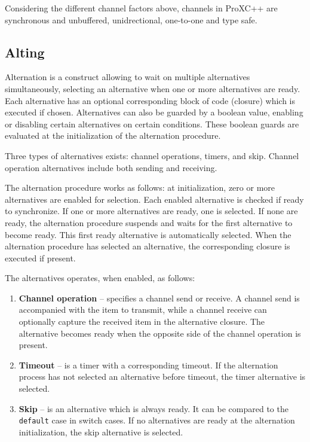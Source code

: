 Considering the different channel factors above, channels in ProXC++ are synchronous and unbuffered, unidrectional, one\hyp{}to\hyp{}one and type safe.


\subsection{Alting}
\label{subsec:alting_design}


Alternation is a construct allowing to wait on multiple alternatives simultaneously, selecting an alternative when one or more alternatives are ready. Each alternative has an optional corresponding block of code (closure) which is executed if chosen. Alternatives can also be guarded by a boolean value, enabling or disabling certain alternatives on certain conditions. These boolean guards are evaluated at the initialization of the alternation procedure.

Three types of alternatives exists: channel operations, timers, and skip. Channel operation alternatives include both sending and receiving.

The alternation procedure works as follows: at initialization, zero or more alternatives are enabled for selection. Each enabled alternative is checked if ready to synchronize. If one or more alternatives are ready, one is selected. If none are ready, the alternation procedure suspends and waits for the first alternative to become ready. This first ready alternative is automatically selected. When the alternation procedure has selected an alternative, the corresponding closure is executed if present.

The alternatives operates, when enabled, as follows:

\begin{enumerate}[topsep=0em,itemsep=-1em,partopsep=0.5em,parsep=1em]
    \item \textbf{Channel operation} -- specifies a channel send or receive. A channel send is accompanied with the item to transmit, while a channel receive can optionally capture the received item in the alternative closure. The alternative becomes ready when the opposite side of the channel operation is present.
    \item \textbf{Timeout} -- is a timer with a corresponding timeout. If the alternation process has not selected an alternative before timeout, the timer alternative is selected.
    \item \textbf{Skip} -- is an alternative which is always ready. It can be compared to the \texttt{default} case in switch cases. If no alternatives are ready at the alternation initialization, the skip alternative is selected. 
\end{enumerate}

